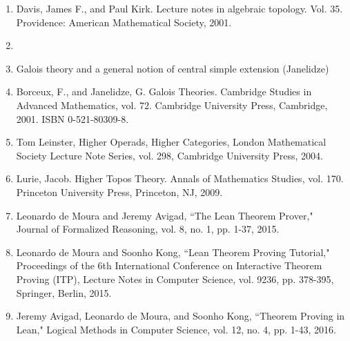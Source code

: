 \documentclass{book}
\theoremstyle{definition}
\begin{document}

\begin{enumerate}
\item Davis, James F., and Paul Kirk. Lecture notes in algebraic topology. Vol. 35. Providence: American Mathematical Society, 2001.
\item 
\item Galois theory and a general notion of central simple extension (Janelidze) 
\item Borceux, F., and Janelidze, G. Galois Theories. Cambridge Studies in Advanced Mathematics, vol. 72. Cambridge University Press, Cambridge, 2001. ISBN 0-521-80309-8.
\item Tom Leinster, Higher Operads, Higher Categories, London Mathematical Society Lecture Note Series, vol. 298, Cambridge University Press, 2004.
\item Lurie, Jacob. Higher Topos Theory. Annals of Mathematics Studies, vol. 170. Princeton University Press, Princeton, NJ, 2009.
\item Leonardo de Moura and Jeremy Avigad, ``The Lean Theorem Prover," Journal of Formalized Reasoning, vol. 8, no. 1, pp. 1-37, 2015.
\item Leonardo de Moura and Soonho Kong, ``Lean Theorem Proving Tutorial," Proceedings of the 6th International Conference on Interactive Theorem Proving (ITP), Lecture Notes in Computer Science, vol. 9236, pp. 378-395, Springer, Berlin, 2015.
\item Jeremy Avigad, Leonardo de Moura, and Soonho Kong, ``Theorem Proving in Lean," Logical Methods in Computer Science, vol. 12, no. 4, pp. 1-43, 2016.

\end{enumerate}
\end{document}
